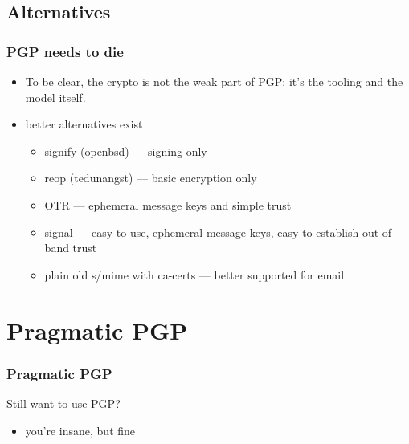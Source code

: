 \documentclass[aspectratio=1610,bigger,utf8]{beamer}
\begin{document}
\subsection{Alternatives}
\begin{frame}
	\frametitle{PGP needs to die}
	\begin{itemize}
		\item To be clear, the \alert{crypto} is not the weak part of
			PGP; it's the tooling and the model itself.
		\item better alternatives exist\pause
			\begin{itemize}
				\item signify (openbsd) --- signing only
				\item reop (tedunangst) --- basic encryption only
				\item OTR --- ephemeral message keys and simple trust
				\item signal --- easy-to-use, ephemeral message
					keys, easy-to-establish out-of-band
					trust
				\item plain old s/mime with ca-certs --- better
					supported for email
			\end{itemize}
	\end{itemize}
\end{frame}

\section{Pragmatic PGP}
\begin{frame}
	\frametitle{Pragmatic PGP}
	Still want to use PGP? 
	\begin{itemize}
		\item you're insane, but fine
	\end{itemize}
\end{frame}
\end{document}
